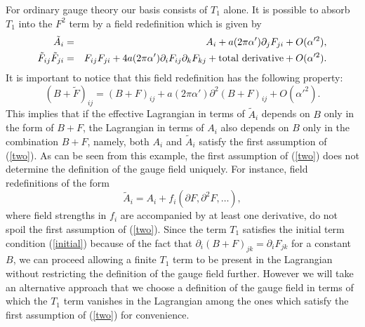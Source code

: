 \documentclass[a4paper,12pt]{article}
\begin{document}
For ordinary gauge theory our basis consists of $T_1$ alone.
It is possible to absorb $T_1$ into the $F^2$ term
by a field redefinition which is given by
\begin{eqnarray}
\tilde{A}_i &=& A_i
+ a (2 \pi \alpha') \partial_j F_{ji}
+ O(\alpha'^2), \\
\tilde{F}_{ij} \tilde{F}_{ji}
&=& F_{ij} F_{ji}
+ 4 a (2 \pi \alpha') \partial_i F_{ij} \partial_k F_{kj}
+ {\rm total~derivative} + O(\alpha'^2).
\end{eqnarray}
It is important to notice that this field redefinition has
the following property:
\begin{equation}
(B+ \tilde{F})_{ij}
= (B+F)_{ij} + a (2 \pi \alpha') \partial^2 (B+F)_{ij}
+ O(\alpha'^2).
\end{equation}
This implies that if the effective Lagrangian
in terms of $\tilde{A}_i$ depends on $B$ only in the form of $B+F$,
the Lagrangian in terms of $A_i$ also depends on $B$
only in the combination $B+F$, namely,
both $A_i$ and $\tilde{A}_i$ satisfy
the first assumption of (\ref{two}).
As can be seen from this example, the first assumption of (\ref{two})
does not determine the definition of the gauge field uniquely.
For instance, field redefinitions of the form
\begin{equation}
\tilde{A}_i = A_i
+ f_i (\partial F, \partial^2 F, \ldots),
\end{equation}
where field strengths in $f_i$
are accompanied by at least one derivative,
do not spoil the first assumption of (\ref{two}).
Since the term $T_1$ satisfies the initial term condition
(\ref{initial}) because of the fact that
$\partial_i (B+F)_{jk} = \partial_i F_{jk}$
for a constant $B$, we can proceed allowing a finite $T_1$ term
to be present in the Lagrangian without restricting
the definition of the gauge field further.
However we will take an alternative approach that
we choose a definition of the gauge field
in terms of which the $T_1$ term vanishes in the Lagrangian
among the ones
which satisfy
the first assumption of (\ref{two})
for convenience.
\end{document}
